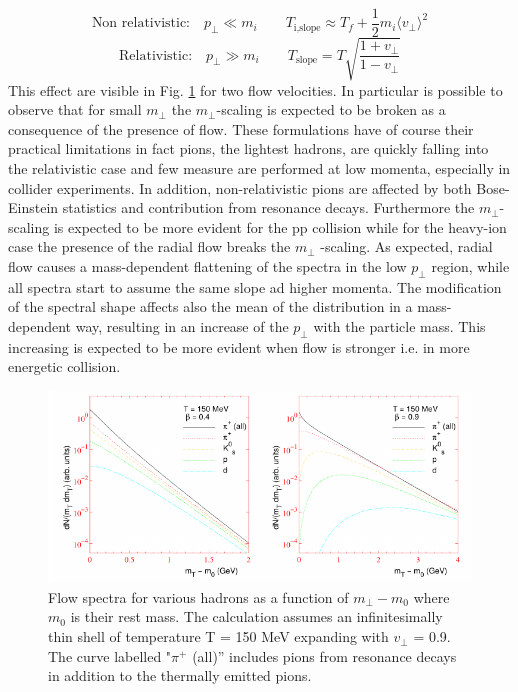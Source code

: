 \documentclass[12pt,a4paper]{book}
\begin{document}
	\begin{equation}
		\text{Non relativistic:}\quad p_\perp \ll m_i \qquad T_{\text{i,slope}} \approx T_f + \frac{1}{2} m_i \langle v_\perp \rangle^2
		\label{eq:T_norel_limit}
	\end{equation}
	\begin{equation}
		\text{Relativistic:}\quad p_\perp \gg m_i \qquad T_{\text{slope}} = T \sqrt{\frac{1+v_\perp}{1-v_\perp}}
		\label{eq:T_rel_limit}
	\end{equation}
	This effect are visible in Fig. \ref{fig:flow_spectra} for two flow velocities. In particular is possible to observe that for small $m_\perp$ the $m_\perp$-scaling is expected to be broken as a consequence of the presence of flow. These formulations have of course their practical limitations in fact pions, the lightest hadrons, are quickly falling into the relativistic case and few measure are performed at low momenta, especially in collider experiments. In addition, non-relativistic pions are affected by both Bose-Einstein statistics and contribution from resonance decays. Furthermore the $m_\perp$-scaling is expected to be more evident for the pp collision while for the heavy-ion case the presence of the radial flow breaks the $m_\perp$ -scaling. As expected, radial flow causes a mass-dependent flattening of the spectra in the low $p_\perp$ region, while all spectra
	start to assume the same slope ad higher momenta. The modification of the spectral shape affects also the mean of the distribution in a mass-dependent way, resulting in an increase of the $p_\perp$ with the particle mass. This increasing is expected to be more evident when flow is stronger i.e. in more energetic collision.
	
	
	\begin{figure}[ht]
		\centering
		\includegraphics[width=0.8\linewidth]{pictures/flow_spectra.png}
		\caption{Flow spectra for various hadrons as a function of $m_\perp-m_0$ where $m_0$ is their rest mass. The calculation assumes an infinitesimally thin shell of temperature T = 150 MeV expanding with $v_\perp$ = 0.9. The curve labelled "$\pi^+$ (all)” includes pions from resonance decays in addition to the thermally emitted pions.}
		\label{fig:flow_spectra} 
	\end{figure}
	
\end{document}
